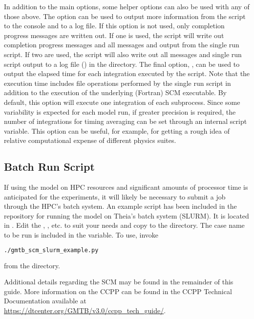 In addition to the main options, some helper options can also be used with any of those above. The  option can be used to output more information from the script to the console and to a log file. If this option is not used, only completion progress messages are written out. If one  is used, the script will write out completion progress messages and all messages and output from the single run script. If two  are used, the script will also write out all messages and single run script output to a log file () in the  directory. The final option, , can be used to output the elapsed time for each integration executed by the script. Note that the execution time includes file operations performed by the single run script in addition to the execution of the underlying (Fortran) SCM executable. By default, this option will execute one integration of each subprocess. Since some variability is expected for each model run, if greater precision is required, the number of integrations for timing averaging can be set through an internal script variable. This option can be useful, for example, for getting a rough idea of relative computational expense of different physics suites.

\subsection{Batch Run Script}

If using the model on HPC resources and significant amounts of processor time is anticipated for the experiments, it will likely be necessary to submit a job through the HPC's batch system. An example script has been included in the repository for running the model on Theia's batch system (SLURM). It is located in . Edit the , , etc. to suit your needs and copy to the  directory. The case name to be run is included in the  variable. To use, invoke
\begin{lstlisting}[language=bash]
./gmtb_scm_slurm_example.py
\end{lstlisting}
from the  directory.

Additional details regarding the SCM may be found in the remainder of this guide. More information on the CCPP can be found in the CCPP Technical Documentation available at \url{https://dtcenter.org/GMTB/v3.0/ccpp\_tech\_guide/}.
